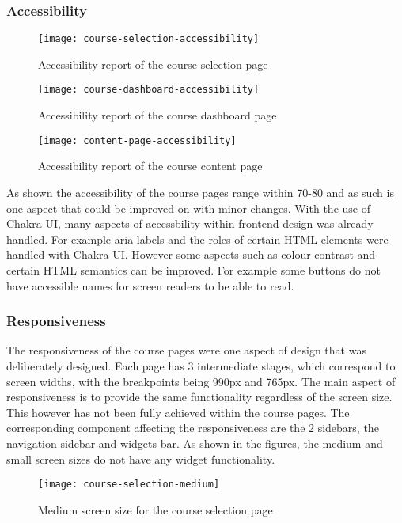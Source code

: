 \subsubsection{Accessibility}
\begin{figure}[h!]
    \centering
    \texttt{[image: course-selection-accessibility]}
    \caption{Accessibility report of the course selection page}
\end{figure}

\begin{figure}[h!]
    \centering
    \texttt{[image: course-dashboard-accessibility]}
    \caption{Accessibility report of the course dashboard page}
\end{figure}

\begin{figure}[h!]
    \centering
    \texttt{[image: content-page-accessibility]}
    \caption{Accessibility report of the course content page}
\end{figure}

As shown the accessibility of the course pages range within 70-80 and as such is one aspect that could be improved on with minor changes. With the use of Chakra UI, many aspects of accessbility within frontend design was already handled. For example aria labels and the roles of certain HTML elements were handled with Chakra UI.
However some aspects such as colour contrast and certain HTML semantics can be improved. For example some buttons do not have accessible names for screen readers to be able to read.

\subsubsection{Responsiveness}
The responsiveness of the course pages were one aspect of design that was deliberately designed. Each page has 3 intermediate stages, which correspond to screen widths, with the breakpoints being 990px and 765px.
The main aspect of responsiveness is to provide the same functionality regardless of the screen size. This however has not been fully achieved within the course pages.
The corresponding component affecting the responsiveness are the 2 sidebars, the navigation sidebar and widgets bar. As shown in the figures, the medium and small screen sizes do not have any widget functionality.


\begin{figure}[h!]
    \centering
    \texttt{[image: course-selection-medium]}
    \caption{Medium screen size for the course selection page}
\end{figure}

